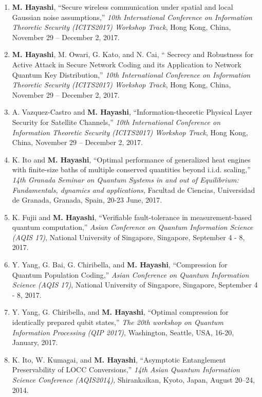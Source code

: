 \documentclass[a4paper,12pt,oneside]{article}
\begin{document}
\begin{enumerate}
\item 
\textbf{M. Hayashi},
``Secure wireless communication under spatial and local Gaussian noise assumptions,''
{\em 10th International Conference on Information Theoretic Security (ICITS2017) Workshop Track}, 
Hong Kong, China, November 29  -- December 2, 2017.


\item 
\textbf{M. Hayashi}, M. Owari, G. Kato, and N. Cai,
`` Secrecy and Robustness for Active Attack in Secure Network Coding and its Application to  Network Quantum Key Distribution,''
{\em 10th International Conference on Information Theoretic Security (ICITS2017) Workshop Track}, 
Hong Kong, China, November 29  -- December 2, 2017.


\item 
A. Vazquez-Castro and \textbf{M. Hayashi},
``Information-theoretic Physical Layer Security for Satellite Channels,''
{\em 10th International Conference on Information Theoretic Security (ICITS2017) Workshop Track}, 
Hong Kong, China, November 29  -- December 2, 2017.

\item 
K. Ito and \textbf{M. Hayashi}, 
``Optimal performance of generalized heat engines with finite-size baths of multiple conserved quantities beyond i.i.d. scaling,'' 
{\em 14th Granada Seminar on Quantum Systems
in and out of Equilibrium: Fundamentals, dynamics and applications,} 
Facultad de Ciencias, Universidad de Granada, Granada, Spain, 20-23 June, 2017.

\item 
K. Fujii and \textbf{M. Hayashi}, ``Verifiable fault-tolerance in measurement-based quantum computation,'' 
{\em Asian Conference on Quantum Information Science (AQIS 17)}, 
National University of Singapore, Singapore, September 4 - 8, 2017.

\item 
Y. Yang, G. Bai, G. Chiribella, and \textbf{M. Hayashi}, ``Compression for Quantum Population Coding,'' 
{\em Asian Conference on Quantum Information Science (AQIS 17)}, 
National University of Singapore, Singapore, September 4 - 8, 2017.

\item 
Y. Yang, G. Chiribella, and \textbf{M. Hayashi}, ``Optimal compression for identically prepared qubit states,'' 
{\em The 20th workshop on Quantum Information Processing (QIP 2017)}, 
Washington, Seattle, USA, 16-20, January, 2017.

\item 
K. Ito, W. Kumagai, and \textbf{M. Hayashi}, 
``Asymptotic Entanglement Preservability of LOCC Conversions,'' 
{\em 14th Asian Quantum Information Science Conference (AQIS2014),} Shirankaikan, Kyoto, Japan, August 20--24, 2014.


\end{enumerate}
\end{document}
